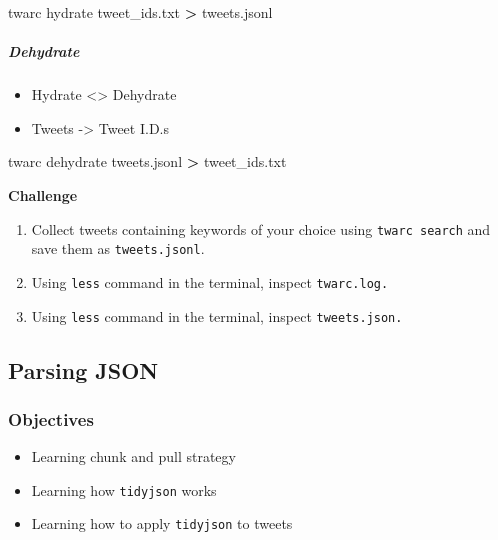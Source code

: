 \documentclass[
]{book}
\newenvironment{Shaded}{\begin{snugshade}}{\end{snugshade}}
\newcommand{\ExtensionTok}[1]{#1}
\newcommand{\NormalTok}[1]{#1}
\newcommand{\OperatorTok}[1]{\textcolor[rgb]{0.81,0.36,0.00}{\textbf{#1}}}
\providecommand{\tightlist}{%
  \setlength{\itemsep}{0pt}\setlength{\parskip}{0pt}}
\begin{document}
\begin{Shaded}
\begin{Highlighting}[]
\ExtensionTok{twarc}\NormalTok{ hydrate tweet\_ids.txt }\OperatorTok{\textgreater{}}\NormalTok{ tweets.jsonl }
\end{Highlighting}
\end{Shaded}

\hypertarget{dehydrate}{%
\subparagraph{Dehydrate}\label{dehydrate}}

\begin{itemize}
\tightlist
\item
  Hydrate \textless\textgreater{} Dehydrate
\item
  Tweets -\textgreater{} Tweet I.D.s
\end{itemize}

\begin{Shaded}
\begin{Highlighting}[]
\ExtensionTok{twarc}\NormalTok{ dehydrate tweets.jsonl }\OperatorTok{\textgreater{}}\NormalTok{ tweet\_ids.txt}
\end{Highlighting}
\end{Shaded}

\textbf{Challenge}

\begin{enumerate}
\def\labelenumi{\arabic{enumi}.}
\item
  Collect tweets containing keywords of your choice using \texttt{twarc\ search} and save them as \texttt{tweets.jsonl}.
\item
  Using \texttt{less} command in the terminal, inspect \texttt{twarc.log.}
\item
  Using \texttt{less} command in the terminal, inspect \texttt{tweets.json.}
\end{enumerate}

\hypertarget{parsing-json}{%
\subsection{Parsing JSON}\label{parsing-json}}

\hypertarget{objectives-6}{%
\subsubsection{Objectives}\label{objectives-6}}

\begin{itemize}
\tightlist
\item
  Learning chunk and pull strategy
\item
  Learning how \texttt{tidyjson} works
\item
  Learning how to apply \texttt{tidyjson} to tweets
\end{itemize}
\end{document}
